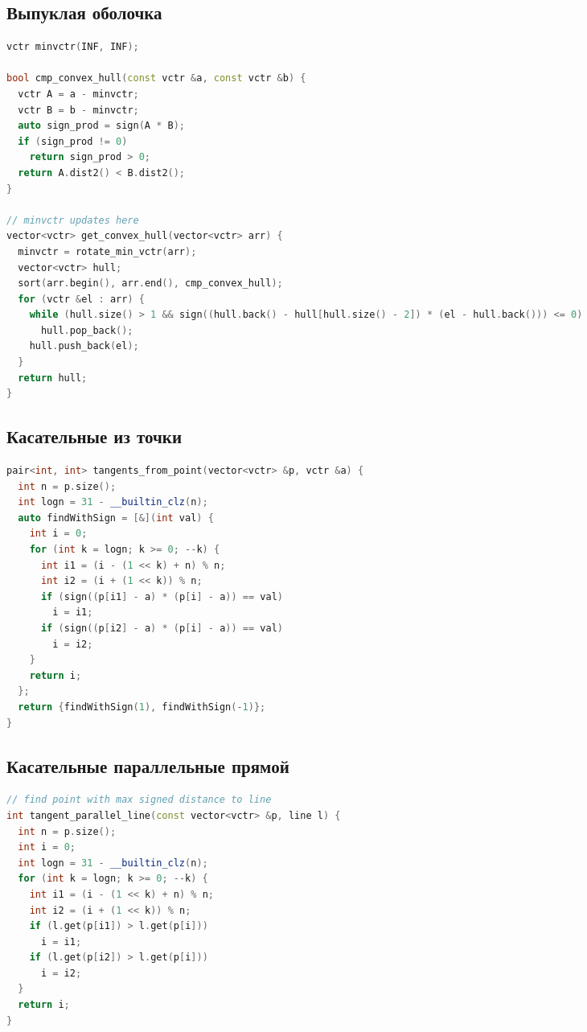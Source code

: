 \documentclass[10pt,a4paper,landscape,twosided]{extarticle}
\begin{document}
\begin{multicols*}{3}
\begin{lstlisting}[language=C++]
\end{lstlisting}

\subsection{Выпуклая оболочка}
\begin{lstlisting}[language=C++]
vctr minvctr(INF, INF);

bool cmp_convex_hull(const vctr &a, const vctr &b) {
  vctr A = a - minvctr;
  vctr B = b - minvctr;
  auto sign_prod = sign(A * B);
  if (sign_prod != 0)
    return sign_prod > 0;
  return A.dist2() < B.dist2();
}

// minvctr updates here
vector<vctr> get_convex_hull(vector<vctr> arr) {
  minvctr = rotate_min_vctr(arr);
  vector<vctr> hull;
  sort(arr.begin(), arr.end(), cmp_convex_hull);
  for (vctr &el : arr) {
    while (hull.size() > 1 && sign((hull.back() - hull[hull.size() - 2]) * (el - hull.back())) <= 0)
      hull.pop_back();
    hull.push_back(el);
  }
  return hull;
}

\end{lstlisting}

\subsection{Касательные из точки}
\begin{lstlisting}[language=C++]
pair<int, int> tangents_from_point(vector<vctr> &p, vctr &a) {
  int n = p.size();
  int logn = 31 - __builtin_clz(n);
  auto findWithSign = [&](int val) {
    int i = 0;
    for (int k = logn; k >= 0; --k) {
      int i1 = (i - (1 << k) + n) % n;
      int i2 = (i + (1 << k)) % n;
      if (sign((p[i1] - a) * (p[i] - a)) == val)
        i = i1;
      if (sign((p[i2] - a) * (p[i] - a)) == val)
        i = i2;
    }
    return i;
  };
  return {findWithSign(1), findWithSign(-1)};
}

\end{lstlisting}

\subsection{Касательные параллельные прямой}
\begin{lstlisting}[language=C++]
// find point with max signed distance to line
int tangent_parallel_line(const vector<vctr> &p, line l) {
  int n = p.size();
  int i = 0;
  int logn = 31 - __builtin_clz(n);
  for (int k = logn; k >= 0; --k) {
    int i1 = (i - (1 << k) + n) % n;
    int i2 = (i + (1 << k)) % n;
    if (l.get(p[i1]) > l.get(p[i]))
      i = i1;
    if (l.get(p[i2]) > l.get(p[i]))
      i = i2;
  }
  return i;
}


\end{lstlisting}
\end{multicols*}
\end{document}
